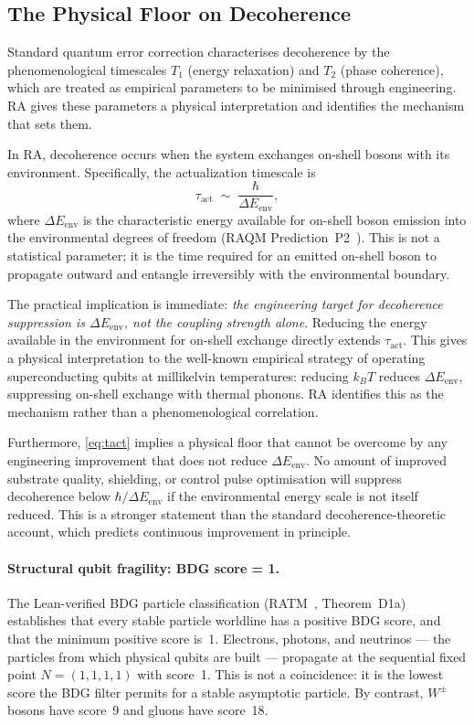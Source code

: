 \documentclass[11pt,a4paper]{article}
\theoremstyle{plain}
\theoremstyle{definition}
\theoremstyle{remark}
\begin{document}
\subsection{The Physical Floor on Decoherence}

Standard quantum error correction characterises decoherence by the phenomenological
timescales $T_1$ (energy relaxation) and $T_2$ (phase coherence), which are
treated as empirical parameters to be minimised through engineering. RA gives these
parameters a physical interpretation and identifies the mechanism that sets them.

In RA, decoherence occurs when the system exchanges on-shell bosons with its
environment. Specifically, the actualization timescale is
\begin{equation}
  \tau_{\mathrm{act}} \;\sim\; \frac{\hbar}{\Delta E_{\mathrm{env}}},
  \label{eq:tact}
\end{equation}
where $\Delta E_{\mathrm{env}}$ is the characteristic energy available for
on-shell boson emission into the environmental degrees of freedom
(RAQM Prediction~P2~\citep{Sandeman2026a}). This is not a statistical parameter;
it is the time required for an emitted on-shell boson to propagate outward and
entangle irreversibly with the environmental boundary.

The practical implication is immediate: \emph{the engineering target for
decoherence suppression is $\Delta E_{\mathrm{env}}$, not the coupling strength
alone}. Reducing the energy available in the environment for on-shell exchange
directly extends $\tau_{\mathrm{act}}$. This gives a physical interpretation to
the well-known empirical strategy of operating superconducting qubits at millikelvin
temperatures: reducing $k_B T$ reduces $\Delta E_{\mathrm{env}}$, suppressing
on-shell exchange with thermal phonons. RA identifies this as the mechanism rather
than a phenomenological correlation.

Furthermore, \eqref{eq:tact} implies a physical floor that cannot be overcome by
any engineering improvement that does not reduce $\Delta E_{\mathrm{env}}$. No
amount of improved substrate quality, shielding, or control pulse optimisation
will suppress decoherence below $\hbar / \Delta E_{\mathrm{env}}$ if the
environmental energy scale is not itself reduced. This is a stronger statement
than the standard decoherence-theoretic account, which predicts continuous
improvement in principle.


\paragraph{Structural qubit fragility: BDG score = 1.}
The Lean-verified BDG particle classification (RATM~\citep{Sandeman2026RATM},
Theorem~D1a) establishes that every stable particle worldline has a positive BDG
score, and that the minimum positive score is~1. Electrons, photons, and neutrinos
--- the particles from which physical qubits are built --- propagate at the
sequential fixed point $N{=}(1,1,1,1)$ with score~1. This is not a coincidence:
it is the lowest score the BDG filter permits for a stable asymptotic particle.
By contrast, $W^{\pm}$ bosons have score~9 and gluons have score~18.
\end{document}
